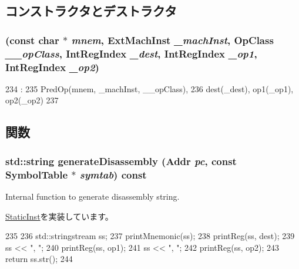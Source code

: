 \subsection{コンストラクタとデストラクタ}
\hypertarget{classRegRegRegOp_a7d65b1f6ccc57959e842690810b55ad8}{
\subsubsection[{RegRegRegOp}]{ (const char $\ast$ {\em mnem}, \/  {\bf ExtMachInst} {\em \_\-machInst}, \/  OpClass {\em \_\-\_\-opClass}, \/  {\bf IntRegIndex} {\em \_\-dest}, \/  {\bf IntRegIndex} {\em \_\-op1}, \/  {\bf IntRegIndex} {\em \_\-op2})}}
\label{classRegRegRegOp_a7d65b1f6ccc57959e842690810b55ad8}



\begin{DoxyCode}
234                                                                        :
235         PredOp(mnem, _machInst, __opClass),
236         dest(_dest), op1(_op1), op2(_op2)
237     {}

\end{DoxyCode}


\subsection{関数}
\hypertarget{classRegRegRegOp_a95d323a22a5f07e14d6b4c9385a91896}{
\subsubsection[{generateDisassembly}]{\setlength{\rightskip}{0pt plus 5cm}std::string generateDisassembly ({\bf Addr} {\em pc}, \/  const SymbolTable $\ast$ {\em symtab}) const}}
\label{classRegRegRegOp_a95d323a22a5f07e14d6b4c9385a91896}
Internal function to generate disassembly string. 

\hyperlink{classStaticInst_ab4a569d2623620c04f8a52bbd91d63b9}{StaticInst}を実装しています。


\begin{DoxyCode}
235 {
236     std::stringstream ss;
237     printMnemonic(ss);
238     printReg(ss, dest);
239     ss << ", ";
240     printReg(ss, op1);
241     ss << ", ";
242     printReg(ss, op2);
243     return ss.str();
244 }
\end{DoxyCode}


